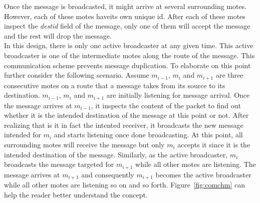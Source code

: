 \documentclass[11pt, titlepage, oneside]{article}
\begin{document}
 
Once the message is broadcasted, it might arrive at several surrounding motes. However, each of these motes haveits own unique id. After each of these motes inspect the {\it destid} field of the message, only one of them will accept the message and the rest will drop the message.\\ 
In this design, there is only one active broadcaster at any given time. This active broadcaster is one of the intermediate motes along the route of the message. This communication scheme prevents message duplication. To elaborate on this point further consider the following scenario. Assume \begin{math}m_{i-1}\end{math}, \begin{math}m_{i}\end{math} and \begin{math}m_{i+1}\end{math}  are three consecutive motes on a route that a message takes from its source to its destination. \begin{math}m_{i-1}\end{math}, \begin{math}m_{i}\end{math} and \begin{math}m_{i+1}\end{math} are initially listening for message arrival. Once the message arrives at \begin{math}m_{i-1}\end{math}, it inspects the content of the packet to find out whether it is the intended destination of the message at this point or not. After realizing that is it in fact the intented receiver, it broadcasts the new message intended for \begin{math}m_{i}\end{math} and starts listening once done broadcasting. At this point, all surrounding motes will receive the message but only \begin{math}m_{i}\end{math} accepts it since it is the intended destination of the message. Similarly, as the active broadcaster, \begin{math}m_{i}\end{math} broadcasts the message targeted for \begin{math}m_{i+1}\end{math} while all other motes are listening. The message arrives at \begin{math}m_{i+1}\end{math} and consequently \begin{math}m_{i+1}\end{math} becomes the active broadcaster while all other motes are listening so on and so forth. Figure~\ref{fig:comchm} can help the reader better understand the concept.
\end{document}
